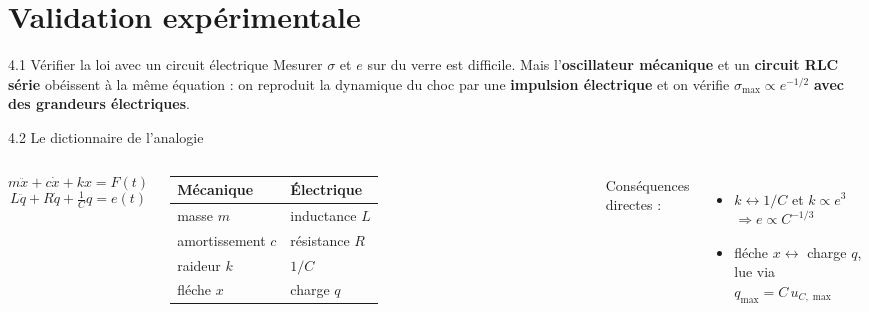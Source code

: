 \documentclass[11pt,aspectratio=169]{beamer}
\begin{document}
\section{Validation expérimentale}
\begin{frame}{4.1 Vérifier la loi avec un circuit électrique}
  \footnotesize
  Mesurer $\sigma$ et $e$ sur du verre est difficile. Mais l'\textbf{oscillateur
  mécanique} et un \textbf{circuit RLC série} obéissent à la même équation : on
  reproduit la dynamique du choc par une \textbf{impulsion électrique} et on
  vérifie $\sigma_{\max}\propto e^{-1/2}$ \textbf{avec des grandeurs électriques}.
  \vspace{0.3cm}
  \centering
\end{frame}

\begin{frame}{4.2 Le dictionnaire de l'analogie}
  \begin{columns}[c]
    \centering\footnotesize
    \[ m\ddot{x}+c\dot{x}+kx=F(t) \]
    \[ L\ddot{q}+R\dot{q}+\tfrac{1}{C}q=e(t) \]
    \begin{tabular}{ll}
    \toprule
    Mécanique & Électrique \\
    \midrule
    masse $m$ & inductance $L$ \\
    amortissement $c$ & résistance $R$ \\
    raideur $k$ & $1/C$ \\
    fléche $x$ & charge $q$ \\
    \bottomrule
    \end{tabular}
    \footnotesize
    Conséquences directes :
    \begin{itemize}
      \item $k\leftrightarrow 1/C$ et $k\propto e^{3}$
            $\Rightarrow \boxed{e\propto C^{-1/3}}$
      \item fléche $x\leftrightarrow$ charge $q$, lue via
            $q_{\max}=C\,u_{C,\max}$
    \end{itemize}
  \end{columns}
\end{frame}
\end{document}

